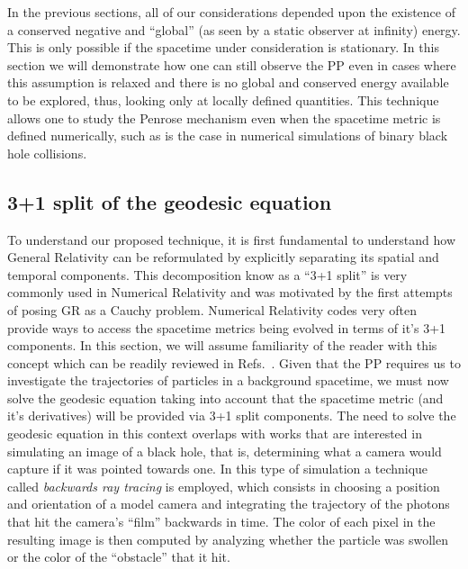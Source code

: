 In the previous sections, all of our considerations depended upon the existence of a conserved negative and ``global'' (as seen by a static observer at infinity) energy. This is only possible if the spacetime under consideration is stationary. In this section we will demonstrate how one can still observe the PP even in cases where this assumption is relaxed and there is no global and conserved energy available to be explored, thus, looking only at locally defined quantities. This technique allows one to study the Penrose mechanism even when the spacetime metric is defined numerically, such as is the case in numerical simulations of binary black hole collisions.

\subsection{3+1 split of the geodesic equation}

To understand our proposed technique, it is first fundamental to understand how General Relativity can be reformulated by explicitly separating its spatial and temporal components. This decomposition know as a ``3+1 split'' is very commonly used in Numerical Relativity and was motivated by the first attempts of posing GR as a Cauchy problem. Numerical Relativity codes very often provide ways to access the spacetime metrics being evolved in terms of it's 3+1 components. In this section, we will assume familiarity of the reader with this concept which can be readily reviewed in Refs.~\cite{Alcubierre2012-xp, 9780521514071, 9781108928250}. Given that the PP requires us to investigate the trajectories of particles in a background spacetime, we must now solve the geodesic equation taking into account that the spacetime metric (and it's derivatives) will be provided via 3+1 split components. The need to solve the geodesic equation in this context overlaps with works that are interested in simulating an image of a black hole, that is, determining what a camera would capture if it was pointed towards one. In this type of simulation a technique called \emph{backwards ray tracing} is employed, which consists in choosing a position and orientation of a model camera and integrating the trajectory of the photons that hit the camera's ``film'' backwards in time. The color of each pixel in the resulting image is then computed by analyzing whether the particle was swollen or the color of the ``obstacle'' that it hit.

